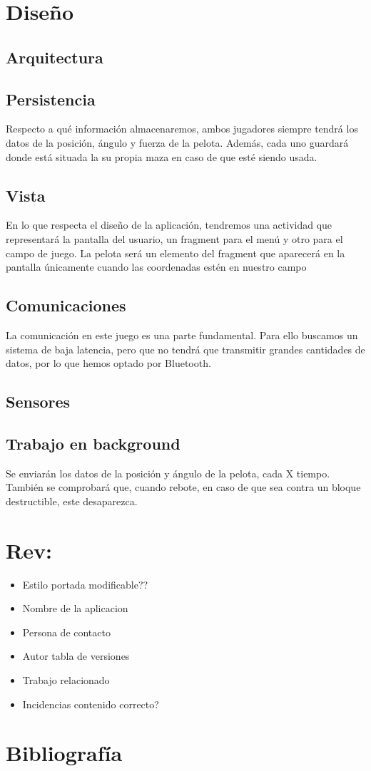 \documentclass[a4paper,openright,12pt]{article}
\begin{document}
\section{Diseño}
\subsection{Arquitectura}
\subsection{Persistencia}
Respecto a qué información almacenaremos, ambos jugadores siempre tendrá los datos de la posición, ángulo y fuerza de la pelota. Además, cada uno guardará donde está situada la su propia maza en caso de que esté siendo usada.
\subsection{Vista}
En lo que respecta el diseño de la aplicación, tendremos una actividad que representará la pantalla del usuario, un fragment para el menú y otro para el campo de juego. La pelota será un elemento del fragment que aparecerá en la pantalla únicamente cuando las coordenadas estén en nuestro campo
\subsection{Comunicaciones}
La comunicación en este juego es una parte fundamental. Para ello buscamos un sistema de baja latencia, pero que no tendrá que transmitir grandes cantidades de datos, por lo que hemos optado por Bluetooth.
\subsection{Sensores}
\subsection{Trabajo en background}
Se enviarán los datos de la posición y ángulo de la pelota, cada X tiempo. También se comprobará que, cuando rebote, en caso de que sea contra un bloque destructible, este desaparezca.
\\


\section*{Rev:}
\begin{itemize}
\item Estilo portada modificable??
\item Nombre de la aplicacion
\item Persona de contacto
\item Autor tabla de versiones
\item Trabajo relacionado 
\item Incidencias contenido correcto?
\end{itemize}

\section{Bibliografía}


\end{document}
